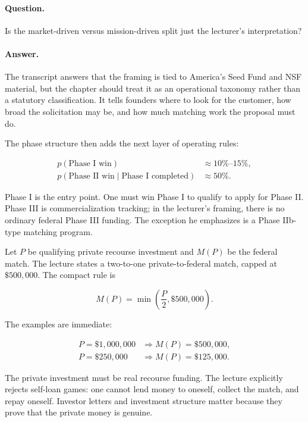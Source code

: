 \paragraph{Question.}
Is the market-driven versus mission-driven split just the lecturer's interpretation?

\paragraph{Answer.}
The transcript answers that the framing is tied to America's Seed Fund and NSF material, but the chapter should treat it as an operational taxonomy rather than a statutory classification. It tells founders where to look for the customer, how broad the solicitation may be, and how much matching work the proposal must do.

The phase structure then adds the next layer of operating rules:

\begin{align}
p(\text{Phase I win}) &\approx 10\%\text{--}15\%,\\
p(\text{Phase II win}\mid \text{Phase I completed}) &\approx 50\%.
\end{align}

Phase I is the entry point. One must win Phase I to qualify to apply for Phase II. Phase III is commercialization tracking; in the lecturer's framing, there is no ordinary federal Phase III funding. The exception he emphasizes is a Phase IIb-type matching program.

Let \(P\) be qualifying private recourse investment and \(M(P)\) be the federal match. The lecture states a two-to-one private-to-federal match, capped at \(\$500{,}000\). The compact rule is

\begin{equation}
M(P)=\min\left(\frac{P}{2},\$500{,}000\right).
\end{equation}

The examples are immediate:

\begin{align}
P=\$1{,}000{,}000
&\Rightarrow
M(P)=\$500{,}000,\\
P=\$250{,}000
&\Rightarrow
M(P)=\$125{,}000.
\end{align}

The private investment must be real recourse funding. The lecture explicitly rejects self-loan games: one cannot lend money to oneself, collect the match, and repay oneself. Investor letters and investment structure matter because they prove that the private money is genuine.

